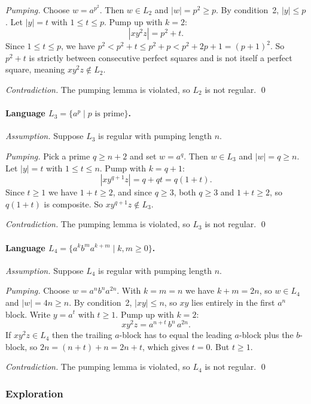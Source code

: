 \documentclass{article}
\theoremstyle{theorem}
\theoremstyle{definition}
\theoremstyle{remark}
\begin{document}
\emph{Pumping.} Choose $w = a^{p^2}$. Then $w \in L_2$ and $|w| = p^2 \geq p$. By condition~2, $|y| \leq p$. Let $|y| = t$ with $1 \leq t \leq p$. Pump up with $k = 2$:
\[
  |xy^2 z| = p^2 + t.
\]
Since $1 \leq t \leq p$, we have $p^2 < p^2 + t \leq p^2 + p < p^2 + 2p + 1 = (p+1)^2$. So $p^2 + t$ is strictly between consecutive perfect squares and is not itself a perfect square, meaning $xy^2 z \notin L_2$.

\emph{Contradiction.} The pumping lemma is violated, so $L_2$ is not regular. \qed

\paragraph{Language $L_3 = \{a^p \mid p \text{ is prime}\}$.}

\emph{Assumption.} Suppose $L_3$ is regular with pumping length $n$.

\emph{Pumping.} Pick a prime $q \geq n + 2$ and set $w = a^q$. Then $w \in L_3$ and $|w| = q \geq n$. Let $|y| = t$ with $1 \leq t \leq n$. Pump with $k = q + 1$:
\[
  |xy^{q+1} z| = q + qt = q(1 + t).
\]
Since $t \geq 1$ we have $1 + t \geq 2$, and since $q \geq 3$, both $q \geq 3$ and $1+t \geq 2$, so $q(1+t)$ is composite. So $xy^{q+1} z \notin L_3$.

\emph{Contradiction.} The pumping lemma is violated, so $L_3$ is not regular. \qed

\paragraph{Language $L_4 = \{a^k b^m a^{k+m} \mid k, m \geq 0\}$.}

\emph{Assumption.} Suppose $L_4$ is regular with pumping length $n$.

\emph{Pumping.} Choose $w = a^n b^n a^{2n}$. With $k = m = n$ we have $k + m = 2n$, so $w \in L_4$ and $|w| = 4n \geq n$. By condition~2, $|xy| \leq n$, so $xy$ lies entirely in the first $a^n$ block. Write $y = a^t$ with $t \geq 1$. Pump up with $k = 2$:
\[
  xy^2 z = a^{n+t}\, b^n\, a^{2n}.
\]
If $xy^2 z \in L_4$ then the trailing $a$-block has to equal the leading $a$-block plus the $b$-block, so $2n = (n + t) + n = 2n + t$, which gives $t = 0$. But $t \geq 1$.

\emph{Contradiction.} The pumping lemma is violated, so $L_4$ is not regular. \qed

\subsubsection{Exploration}
\end{document}
